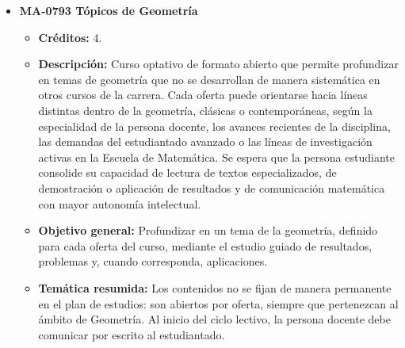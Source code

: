 \begin{itemize}[leftmargin=1.3em, itemsep=10pt, topsep=4pt, label={\color{Azul-UCR}$\blacksquare$}]
\item {\color{Azul-UCR}\textbf{MA-0793 Tópicos de Geometría}}\par\nopagebreak\smallskip
\begin{itemize}[leftmargin=1.1em, itemsep=3pt, topsep=2pt, parsep=2pt, label={\textendash}]
\item \textbf{Créditos:} 4.
\item \textbf{Descripción:} Curso optativo de formato abierto que permite profundizar en temas de geometría que no se desarrollan de manera sistemática en otros cursos de la carrera. Cada oferta puede orientarse hacia líneas distintas dentro de la geometría, clásicas o contemporáneas, según la especialidad de la persona docente, los avances recientes de la disciplina, las demandas del estudiantado avanzado o las líneas de investigación activas en la Escuela de Matemática. Se espera que la persona estudiante consolide su capacidad de lectura de textos especializados, de demostración o aplicación de resultados y de comunicación matemática con mayor autonomía intelectual.
\item \textbf{Objetivo general:} Profundizar en un tema de la geometría, definido para cada oferta del curso, mediante el estudio guiado de resultados, problemas y, cuando corresponda, aplicaciones.
\item \textbf{Temática resumida:} Los contenidos no se fijan de manera permanente en el plan de estudios: son abiertos por oferta, siempre que pertenezcan al ámbito de Geometría. Al inicio del ciclo lectivo, la persona docente debe comunicar por escrito al estudiantado.
\end{itemize}


\end{itemize}
